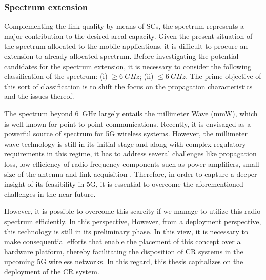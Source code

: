 \subsubsection*{Spectrum extension}
Complementing the link quality by means of SCs, the spectrum represents a major contribution to the desired areal capacity. Given the present situation of the spectrum allocated to the mobile applications, it is difficult to procure an extension to already allocated spectrum. Before investigating the potential candidates for the spectrum extension, it is necessary to consider the following classification of the spectrum:
(i) $\ge \SI{6}{GHz}$;
(ii) $\le \SI{6}{GHz}$.
The prime objective of this sort of classification is to shift the focus on the propagation characteristics and the issues thereof.


The spectrum beyond \SI{6}{GHz} largely entails the millimeter Wave (mmW), which is well-known for point-to-point communications. Recently, it is envisaged as a powerful source of spectrum for 5G wireless systems. However, the millimeter wave technology is still in its initial stage and along with complex regulatory requirements in this regime, it has to address several challenges like propagation loss, low efficiency of radio frequency components such as power amplifiers, small size of the antenna and link acquisition \cite{Rapp13}. Therefore, in order to capture a deeper insight of its feasibility in 5G, it is essential to overcome the aforementioned challenges in the near future.

 However, it is possible to overcome this scarcity if we manage to utilize this radio spectrum efficiently. In this perspective,  However, from a deployment perspective, this technology is still in its preliminary phase. In this view, it is necessary to make consequential efforts that enable the placement of this concept over a hardware platform, thereby facilitating the disposition of CR systems in the upcoming 5G wireless networks. In this regard, this thesis capitalizes on the deployment of the CR system. 

